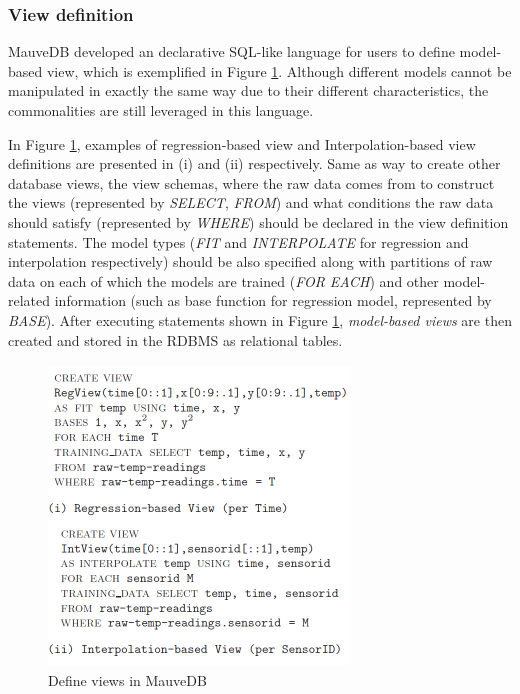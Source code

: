 \subsubsection{View definition}

MauveDB developed an declarative SQL-like language for users to define model-based view, which is exemplified in Figure \ref{fig:MauveDB_view_def}. Although different models cannot be manipulated in exactly the same way due to their different characteristics, the commonalities are still leveraged in this language. 

In Figure \ref{fig:MauveDB_view_def}, examples of regression-based view and Interpolation-based view definitions are presented in (i) and (ii) respectively. Same as way to create other database views, the view schemas, where the raw data comes from to construct the views (represented by \textit{SELECT}, \textit{FROM}) and what conditions the raw data should satisfy (represented by \textit{WHERE}) should be declared in the view definition statements. The model types (\textit{FIT} and \textit{INTERPOLATE} for regression and interpolation respectively) should be also specified along with partitions of raw data on each of which the models are trained (\textit{FOR EACH}) and other model-related information (such as base function for regression model, represented by \textit{BASE}). After executing statements shown in Figure \ref{fig:MauveDB_view_def}, {\em model-based views} are then created and stored in the RDBMS as relational tables.


\begin{figure}
    \centering
    \includegraphics[width=8cm, height=8cm]{Figures/MauveDB_create_view.png}
    \caption{Define views in MauveDB}
    \label{fig:MauveDB_view_def}
\end{figure}

